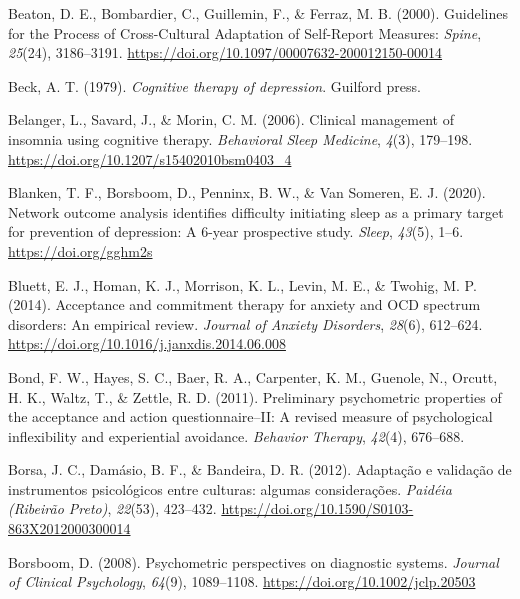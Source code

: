 \documentclass[
  ,doc,11pt, twoside,floatsintext]{apa6}
\newlength{\cslhangindent}
\newlength{\cslentryspacingunit} %
\newenvironment{CSLReferences}[2] %
 {%
  \setlength{\parindent}{0pt}
  \ifodd #1
  \let\oldpar\par
  \def\par{\hangindent=\cslhangindent\oldpar}
  \fi
  \setlength{\parskip}{#2\cslentryspacingunit}
 }%
 {}
\begin{document}
\begin{CSLReferences}{1}{0}
\leavevmode{}%
Beaton, D. E., Bombardier, C., Guillemin, F., \& Ferraz, M. B. (2000). Guidelines for the {Process} of {Cross-Cultural Adaptation} of {Self-Report Measures}: \emph{Spine}, \emph{25}(24), 3186--3191. \url{https://doi.org/10.1097/00007632-200012150-00014}

\leavevmode{}%
Beck, A. T. (1979). \emph{Cognitive therapy of depression}. Guilford press.

\leavevmode{}%
Belanger, L., Savard, J., \& Morin, C. M. (2006). Clinical management of insomnia using cognitive therapy. \emph{Behavioral Sleep Medicine}, \emph{4}(3), 179--198. \url{https://doi.org/10.1207/s15402010bsm0403_4}

\leavevmode{}%
Blanken, T. F., Borsboom, D., Penninx, B. W., \& Van Someren, E. J. (2020). Network outcome analysis identifies difficulty initiating sleep as a primary target for prevention of depression: A 6-year prospective study. \emph{Sleep}, \emph{43}(5), 1--6. \url{https://doi.org/gghm2s}

\leavevmode{}%
Bluett, E. J., Homan, K. J., Morrison, K. L., Levin, M. E., \& Twohig, M. P. (2014). Acceptance and commitment therapy for anxiety and {OCD} spectrum disorders: {An} empirical review. \emph{Journal of Anxiety Disorders}, \emph{28}(6), 612--624. \url{https://doi.org/10.1016/j.janxdis.2014.06.008}

\leavevmode{}%
Bond, F. W., Hayes, S. C., Baer, R. A., Carpenter, K. M., Guenole, N., Orcutt, H. K., Waltz, T., \& Zettle, R. D. (2011). Preliminary psychometric properties of the acceptance and action questionnaire--II: A revised measure of psychological inflexibility and experiential avoidance. \emph{Behavior Therapy}, \emph{42}(4), 676--688.

\leavevmode{}%
Borsa, J. C., Damásio, B. F., \& Bandeira, D. R. (2012). {Adaptação e validação de instrumentos psicológicos entre culturas: algumas considerações}. \emph{Paidéia (Ribeirão Preto)}, \emph{22}(53), 423--432. \url{https://doi.org/10.1590/S0103-863X2012000300014}

\leavevmode{}%
Borsboom, D. (2008). Psychometric perspectives on diagnostic systems. \emph{Journal of Clinical Psychology}, \emph{64}(9), 1089--1108. \url{https://doi.org/10.1002/jclp.20503}


\end{CSLReferences}
\end{document}
